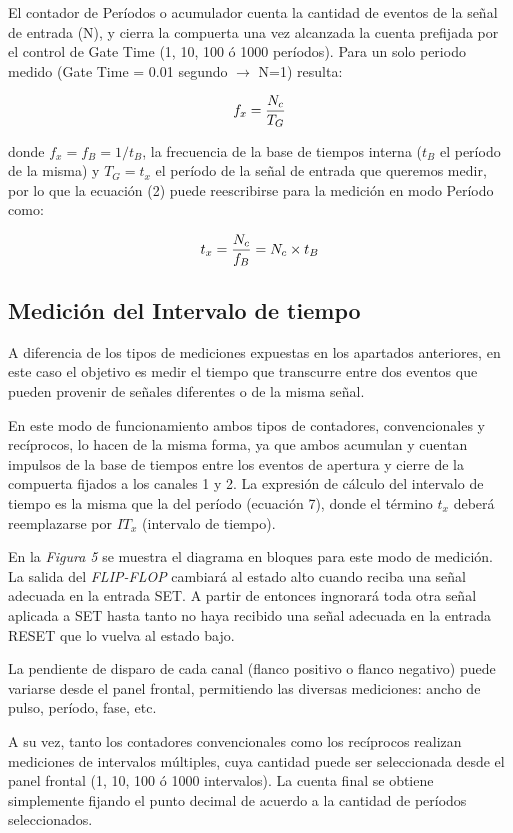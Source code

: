 \documentclass{article}
\begin{document}
	El contador de Períodos o acumulador cuenta la cantidad de eventos de la señal de entrada (N), y cierra la compuerta una vez alcanzada la cuenta prefijada por el control de Gate Time (1, 10, 100 ó 1000 períodos). Para un solo periodo medido (Gate Time = 0.01 segundo $\rightarrow$ N=1) resulta:
\medskip

\begin{equation}
	f_x = {N_c \over T_G}
\end{equation}
\medskip

\noindent donde $f_x = f_B = 1/t_B$, la frecuencia de la base de tiempos interna ($t_B$ el período de la misma) y $T_G = t_x$ el período de la señal de entrada que queremos medir, por lo que la ecuación (2) puede reescribirse para la medición en modo Período como:
\medskip

\begin{equation}
	t_x = {N_c \over f_B} = N_c \times t_B
\end{equation}
\bigskip\bigskip



\subsection{Medición del Intervalo de tiempo}
\medskip

	A diferencia de los tipos de mediciones expuestas en los apartados anteriores, en este caso el objetivo es medir el tiempo que transcurre entre dos eventos que pueden provenir de señales diferentes o de la misma señal.
	\par
	En este modo de funcionamiento ambos tipos de contadores, convencionales y recíprocos, lo hacen de la misma forma, ya que ambos acumulan y cuentan impulsos de la base de tiempos entre los eventos de apertura y cierre de la compuerta fijados a los canales 1 y 2. La expresión de cálculo del intervalo de tiempo es la misma que la del período (ecuación 7), donde el término $t_x$ deberá reemplazarse por $IT_x$ (intervalo de tiempo).
	\par
	En la \textit{Figura 5} se muestra el diagrama en bloques para este modo de medición. La salida del \textit{FLIP-FLOP} cambiará al estado alto cuando reciba una señal adecuada en la entrada SET. A partir de entonces ingnorará toda otra señal aplicada a SET hasta tanto no haya recibido una señal adecuada en la entrada RESET que lo vuelva al estado bajo.
	\par
	La pendiente de disparo de cada canal (flanco positivo o flanco negativo) puede variarse desde el panel frontal, permitiendo las diversas mediciones: ancho de pulso, período, fase, etc.
	\par
	A su vez, tanto los contadores convencionales como los recíprocos realizan mediciones de intervalos múltiples, cuya cantidad puede ser seleccionada desde el panel frontal (1, 10, 100 ó 1000 intervalos). La cuenta final se obtiene simplemente fijando el punto decimal de acuerdo a la cantidad de períodos seleccionados.
\bigskip\bigskip
\end{document}

